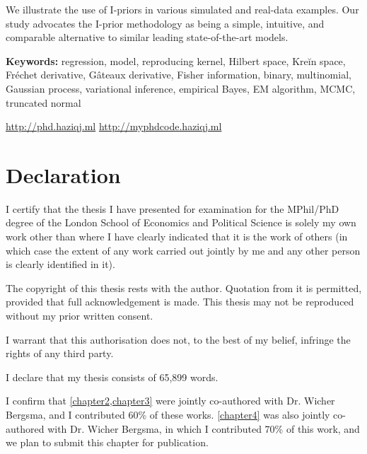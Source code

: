\documentclass[11pt,twoside,openright,showframe]{report}
\begin{document}
We illustrate the use of I-priors in various simulated and real-data examples. 
Our study advocates the I-prior methodology as being a simple, intuitive, and comparable alternative to similar leading state-of-the-art models. 


\vspace{1em}
{\noindent\textbf{Keywords:} 
	regression, model, reproducing kernel, Hilbert space, Kreĭn space, Fréchet derivative, Gâteaux derivative, Fisher information, binary, multinomial, Gaussian process, variational inference, empirical Bayes, EM algorithm, MCMC, truncated normal
}

\vfill

\begin{center}
  \url{http://phd.haziqj.ml} \textbullet{} \url{http://myphdcode.haziqj.ml}
\end{center}

\chapter*{Declaration} 

I certify that the thesis I have presented for examination for the MPhil/PhD degree of the London School of Economics and Political Science is solely my own work other than where I have clearly indicated that it is the work of others (in which case the extent of any work carried out jointly by me and any other person is clearly identified in it).

The copyright of this thesis rests with the author. Quotation from it is permitted, provided that full acknowledgement is made. 
This thesis may not be reproduced without my prior written consent.

I warrant that this authorisation does not, to the best of my belief, infringe the rights of any third party.

I declare that my thesis consists of 65,899 words.

I confirm that \cref{chapter2,chapter3} were jointly co-authored with Dr. Wicher Bergsma, and I contributed 60\% of these works.
\cref{chapter4} was also jointly co-authored with Dr. Wicher Bergsma, in which I contributed 70\% of this work, and we plan to submit this chapter for publication.
\end{document}
